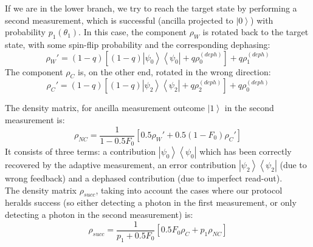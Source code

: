\documentclass[12pt]{article}
\def\bra#1{\left<#1\right|}
\def\ket#1{\left|#1\right>}
\begin{document}
If we are in the lower branch, we try to reach the target state by performing a second measurement, which is successful (ancilla projected to $\ket{0}$) with probability $p_1 (\theta_1)$. In this case, the component $\rho_W$ is rotated back to the target state, with some spin-flip probability and the corresponding dephasing:
\begin{equation}
 \rho_{W}' = (1-q) \left[ (1-q) \ket{\psi_0}\bra{\psi_0} + q \rho_0^{(deph)} \right] +q \rho_1^{(deph)}
\end{equation}
The component $\rho_C$ is, on the other end, rotated in the wrong direction:
\begin{equation}
  \rho_{C}' = (1-q) \left[ (1-q) \ket{\psi_2}\bra{\psi_2} + q \rho_2^{(deph)} \right] +q \rho_0^{(deph)}
 \label{eq:rho1c}
\end{equation}

The density matrix, for ancilla measurement outcome $\ket{1}$ in the second measurement is:
\begin{equation}
 \rho_{NC} = \frac{1}{1-0.5F_0} \left[ 0.5 \rho_W' + 0.5 (1-F_0) \rho_C' \right]
\end{equation}
It consists of three terms: a contribution $\ket{\psi_0}\bra{\psi_0}$ which has been correctly recovered by the adaptive measurement, an error contribution $\ket{\psi_2}\bra{\psi_2}$ (due to wrong feedback) and a dephased contribution (due to imperfect read-out).\\
The density matrix $\rho_{succ}$, taking into account the cases where our protocol heralds success (so either detecting a photon in the first measurement, or only detecting a photon in the second measurement) is:
\begin{equation}
\rho_{succ} = \frac{1}{p_1 + 0.5 F_0} \left[  0.5 F_0  \rho_C + p_1 \rho_{NC} \right]
\end{equation}
\end{document}
